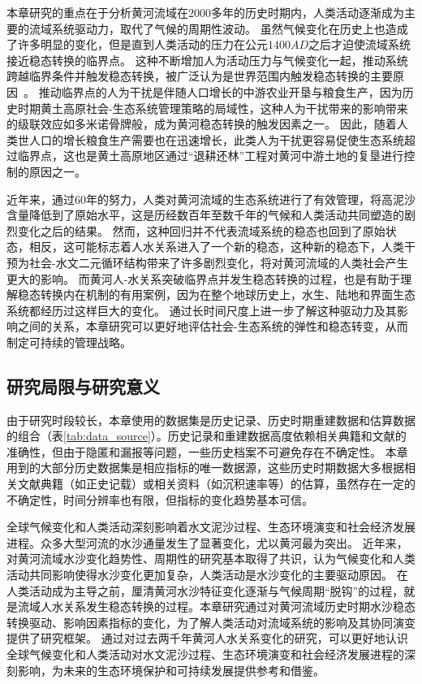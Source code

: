 本章研究的重点在于分析黄河流域在$2000$多年的历史时期内，人类活动逐渐成为主要的流域系统驱动力，取代了气候的周期性波动。
虽然气候变化在历史上也造成了许多明显的变化，但是直到人类活动的压力在公元$1400AD$之后才迫使流域系统接近稳态转换的临界点。
这种不断增加人为活动压力与气候变化一起，推动系统跨越临界条件并触发稳态转换，被广泛认为是世界范围内触发稳态转换的主要原因~\cite{scheffer2001,scheffer2003}。
推动临界点的人为干扰是伴随人口增长的中游农业开垦与粮食生产，因为历史时期黄土高原社会-生态系统管理策略的局域性，这种人为干扰带来的影响带来的级联效应如多米诺骨牌般，成为黄河稳态转换的触发因素之一\cite{rocha2018,wu2020a}。
因此，随着人类世人口的增长粮食生产需要也在迅速增长，此类人为干扰更容易促使生态系统超过临界点，这也是黄土高原地区通过“退耕还林”工程对黄河中游土地的复垦进行控制的原因之一。

近年来，通过60年的努力，人类对黄河流域的生态系统进行了有效管理，将高泥沙含量降低到了原始水平，这是历经数百年至数千年的气候和人类活动共同塑造的剧烈变化之后的结果\cite{wang2016e, ji2018}。
然而，这种回归并不代表流域系统的稳态也回到了原始状态，相反，这可能标志着人水关系进入了一个新的稳态，这种新的稳态下，人类干预为社会-水文二元循环结构带来了许多剧烈变化，将对黄河流域的人类社会产生更大的影响。
而黄河人-水关系突破临界点并发生稳态转换的过程，也是有助于理解稳态转换内在机制的有用案例，因为在整个地球历史上，水生、陆地和界面生态系统都经历过这样巨大的变化\cite{hughes2013, rocha2018}。
通过长时间尺度上进一步了解这种驱动力及其影响之间的关系，本章研究可以更好地评估社会-生态系统的弹性和稳态转变，从而制定可持续的管理战略\cite{scheffer2003}。

\subsection{研究局限与研究意义}

由于研究时段较长，本章使用的数据集是历史记录、历史时期重建数据和估算数据的组合（表\ref{tab:data_source}）。历史记录和重建数据高度依赖相关典籍和文献的准确性，但由于隐匿和漏报等问题，一些历史档案不可避免存在不确定性\cite{wu2020a}。
本章用到的大部分历史数据集是相应指标的唯一数据源，这些历史时期数据大多根据相关文献典籍（如正史记载）或相关资料（如沉积速率等）的估算，虽然存在一定的不确定性，时间分辨率也有限，但指标的变化趋势基本可信。

全球气候变化和人类活动深刻影响着水文泥沙过程、生态环境演变和社会经济发展进程。众多大型河流的水沙通量发生了显著变化，尤以黄河最为突出\cite{best2019, best2020}。
近年来，对黄河流域水沙变化趋势性、周期性的研究基本取得了共识，认为气候变化和人类活动共同影响使得水沙变化更加复杂，人类活动是水沙变化的主要驱动原因\cite{wang2016a, ma2020}。
在人类活动成为主导之前，厘清黄河水沙特征变化逐渐与气候周期“脱钩”的过程，就是流域人水关系发生稳态转换的过程。本章研究通过对黄河流域历史时期水沙稳态转换驱动、影响因素指标的变化，为了解人类活动对流域系统的影响及其协同演变提供了研究框架。
通过对过去两千年黄河人水关系变化的研究，可以更好地认识全球气候变化和人类活动对水文泥沙过程、生态环境演变和社会经济发展进程的深刻影响，为未来的生态环境保护和可持续发展提供参考和借鉴。
